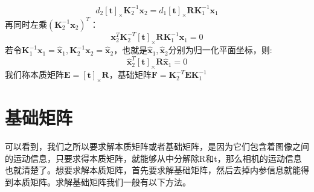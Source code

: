 \begin{equation}
d_{2} \left[\boldsymbol{t}\right]_{\times}\boldsymbol{K}_{2}^{-1} \boldsymbol{x}_{2}=d_{1}\left[\boldsymbol{t}\right]_{\times}\boldsymbol{R} \boldsymbol{K}_{1}^{-1} \boldsymbol{x}_{1}
\end{equation}
再同时左乘$\left(\boldsymbol{K}_{2}^{-1} \boldsymbol{x}_{2}\right)^T$：
\begin{equation}
\boldsymbol{x}_{2}^T\boldsymbol{K}_{2}^{-T} \left[\boldsymbol{t}\right]_{\times}\boldsymbol{R} \boldsymbol{K}_{1}^{-1} \boldsymbol{x}_{1}=0
\end{equation}
若令$\boldsymbol{K}_{1}^{-1} \boldsymbol{x}_{1}=\hat{\boldsymbol{x}}_1,\boldsymbol{K}_{2}^{-1} \boldsymbol{x}_{2}=\hat{\boldsymbol{x}}_2$，也就是$\hat{\boldsymbol{x}}_1,\hat{\boldsymbol{x}}_2$分别为归一化平面坐标，则:
\begin{equation}
\hat{\boldsymbol{x}}_2^T\left[\boldsymbol{t}\right]_{\times}\boldsymbol{R}\hat{\boldsymbol{x}}_1=0
\end{equation}
我们称本质矩阵$\boldsymbol{E}=[\boldsymbol{t}]_{\times} \boldsymbol{R}$，基础矩阵$\boldsymbol{F}=\boldsymbol{K}_{2}^{-T} \boldsymbol{E} \boldsymbol{K}_{1}^{-1}$\par
\section{基础矩阵}
可以看到，我们之所以要求解本质矩阵或者基础矩阵，是因为它们包含着图像之间的运动信息，只要求得本质矩阵，就能够从中分解除R和t，那么相机的运动信息也就清楚了。想要求解本质矩阵，首先要求解基础矩阵，然后去掉内参信息就能得到本质矩阵。求解基础矩阵我们一般有以下方法。
